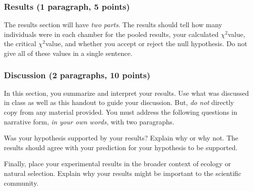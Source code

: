 \documentclass[12pt, hidelinks]{exam}
\newcommand\chisq{$\chi^2$}
\begin{document}
\subsubsection*{Results (1 paragraph, 5 points)}

The results section will have \emph{two parts}. The results should tell how many individuals were in each chamber for the pooled results, your calculated \chisq value, the critical \chisq value, and whether you accept or reject the null hypothesis. Do not give all of these values in a single sentence.


\subsubsection*{Discussion (2 paragraphs, 10 points)} 

In this section, you summarize and interpret your results. Use what
was discussed in class as well as this handout to guide
your discussion. But, \emph{do not} directly copy from any material provided.
You must address the following questions in narrative form, \emph{in your own words,} with two
paragraphs.

Was your hypothesis supported by your results? Explain why or why not. 
The results should agree with your prediction for your hypothesis to be supported. 

Finally, place your experimental results in the broader context of ecology or natural
selection. Explain why your results might be important to the
scientific community.
\end{document}
